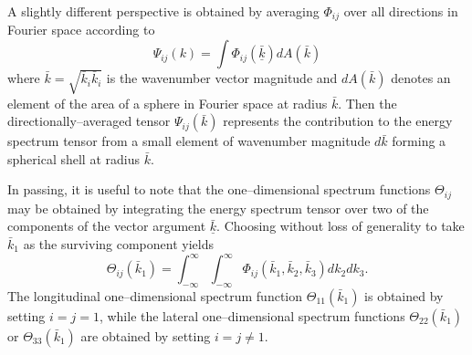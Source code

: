 \documentclass[dvips]{article}
\begin{document}
A slightly different perspective is obtained by averaging $\Phi_{ij}$
over all directions in Fourier space according to
\begin{equation}
\Psi_{ij}(k) = \int \Phi_{ij}(\underline{\bar{k}}) dA(\bar{k})
\label{PSIDEF}
\end{equation}
where $\bar{k} = \sqrt{\bar{k}_{i}\bar{k}_{i}}$ is the wavenumber vector
magnitude and $dA(\bar{k})$ denotes an element of the area of a sphere in
Fourier space at
radius $\bar{k}$.  Then the directionally--averaged tensor
$\Psi_{ij}(\bar{k})$ represents
the contribution to the energy spectrum tensor from a small element of
wavenumber magnitude $d\bar{k}$ forming a spherical shell at radius
$\bar{k}$.

In passing, it is useful to note that the one--dimensional spectrum functions
$\Theta_{ij}$ may be obtained by
integrating the energy spectrum tensor over two of the components of the vector
argument $\underline{\bar{k}}$.  Choosing without loss of generality to take
$\bar{k}_{1}$ as the surviving component yields
\begin{equation}
\Theta_{ij}(\bar{k}_{1}) = \int_{-\infty}^{\infty} \int_{-\infty}^{\infty}
\Phi_{ij}(\bar{k}_{1},\bar{k}_{2},\bar{k}_{3})dk_{2}dk_{3}.
\label{SPECF1D}
\end{equation}
The longitudinal one--dimensional spectrum function
$\Theta_{11}(\bar{k}_{1})$ is obtained by setting $i=j=1$,
while the lateral one--dimensional spectrum functions
$\Theta_{22}(\bar{k}_{1})$ or $\Theta_{33}(\bar{k}_{1})$ are obtained by
setting $i=j\neq 1$.\\[2mm]
\end{document}
